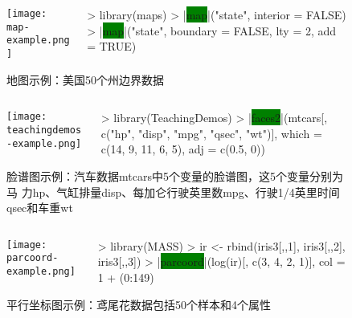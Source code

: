 \begin{frame}[c,fragile]{\subsecname}{}
\begin{figure}
 \begin{columns}
    \begin{column}[c]{.5\textwidth}
        \texttt{[image: map-example.png]}
    \end{column}

    \begin{column}[c]{.5\textwidth}
\begin{rcode}
> library(maps)
> |\colorbox{green}{map}|("state", interior = FALSE)
> |\colorbox{green}{map}|("state", boundary = FALSE, lty = 2, add = TRUE)
\end{rcode}
    \end{column}
  \end{columns}
  \caption{地图示例：美国50个州边界数据}
\end{figure}
\end{frame}

\begin{frame}[c,fragile]{\subsecname}{}
\begin{figure}
 \begin{columns}
    \begin{column}[c]{.5\textwidth}
        \texttt{[image: teachingdemos-example.png]}
    \end{column}

    \begin{column}[c]{.5\textwidth}
\begin{rcode}
> library(TeachingDemos)
> |\colorbox{green}{faces2}|(mtcars[, c("hp", "disp", "mpg", "qsec", "wt")], which = c(14, 9, 11, 6, 5), adj = c(0.5, 0))
\end{rcode}
    \end{column}
  \end{columns}
  \caption{脸谱图示例：汽车数据mtcars中5个变量的脸谱图，这5个变量分别为马
力hp、气缸排量disp、每加仑行驶英里数mpg、行驶1/4英里时间qsec和车重wt}
\end{figure}
\end{frame}

\begin{frame}[c,fragile]{\subsecname}{}
\begin{figure}
 \begin{columns}
    \begin{column}[c]{.5\textwidth}
        \texttt{[image: parcoord-example.png]}
    \end{column}

    \begin{column}[c]{.5\textwidth}
\begin{rcode}
> library(MASS)
> ir <- rbind(iris3[,,1], iris3[,,2], iris3[,,3])
> |\colorbox{green}{parcoord}|(log(ir)[, c(3, 4, 2, 1)], col = 1 + (0:149)%
\end{rcode}
    \end{column}
  \end{columns}
  \caption{平行坐标图示例：鸢尾花数据包括50个样本和4个属性}
\end{figure}
\end{frame}

